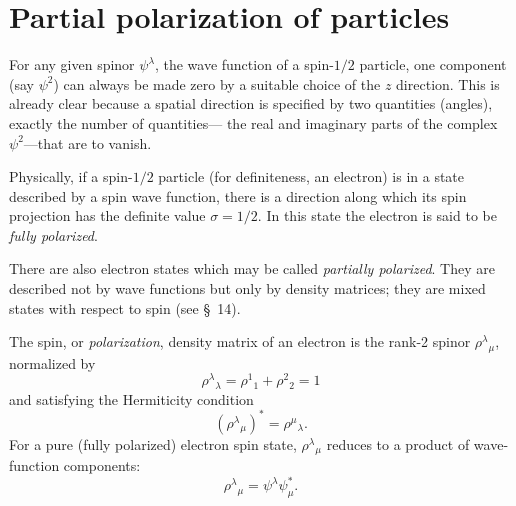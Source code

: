 \section{Partial polarization of particles}

For any given spinor $\psi^\lambda$, the wave function of a spin-$1/2$
particle, one component (say $\psi^2$) can always be made zero by a suitable
choice of the $z$ direction. This is already clear because a spatial direction
is specified by two quantities (angles), exactly the number of quantities---
the real and imaginary parts of the complex $\psi^2$---that are to vanish.

Physically, if a spin-$1/2$ particle (for definiteness, an electron) is in a
state described by a spin wave function, there is a direction along which its
spin projection has the definite value $\sigma=1/2$. In this state the
electron is said to be \emph{fully polarized}.

There are also electron states which may be called \emph{partially
polarized}. They are described not by wave functions but only by density
matrices; they are mixed states with respect to spin (see \S~14).

The spin, or \emph{polarization}, density matrix of an electron is the rank-2
spinor $\rho^\lambda{}_{\mu}$, normalized by
\begin{equation}
 \rho^\lambda{}_{\lambda}=\rho^1{}_1+\rho^2{}_2=1
 \tag{59.1}
\end{equation}
and satisfying the Hermiticity condition
\begin{equation}
 (\rho^\lambda{}_{\mu})^*=\rho^\mu{}_{\lambda}.
 \tag{59.2}
\end{equation}
For a pure (fully polarized) electron spin state,
$\rho^\lambda{}_{\mu}$ reduces to a product of wave-function components:
\begin{equation}
 \rho^\lambda{}_{\mu}=\psi^\lambda\psi_{\mu}^*.
 \tag{59.3}
\end{equation}


